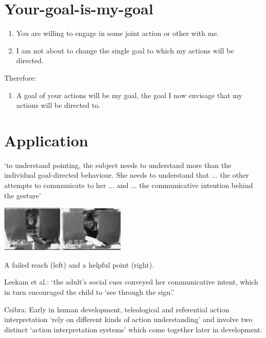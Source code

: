 \documentclass[11pt]{extarticle}
\begin{document}
\begin{multicols}{3}
\section{Your-goal-is-my-goal}
\begin{enumerate}
\item You are willing to engage in some joint action or other with me.

\item I am not about to change the single goal to which my actions will be directed.

\end{enumerate}
%
Therefore:
%
\begin{enumerate}[resume]
%
\item A goal of your actions will be my goal, the goal I now envisage that my actions will be directed to.
\end{enumerate}
%

\section{Application}

`to understand pointing, the subject needs to understand more than the individual goal-directed behaviour. She needs to understand that ... the other attempts to communicate to her ...  and ... the communicative intention behind the gesture'\citep{Moll:2007gu}


\begin{center}
\includegraphics[width=6cm]{figure_hare_toma_2004_e3.png}
\label{fig:reach_point}

A failed reach (left) and a helpful point (right).\citep%
	{hare_chimpanzees_2004}
\end{center}



Leekam et al.: `the adult’s social cues conveyed her communicative intent, which in turn encouraged the child to `see through the sign'.'
\citep%
{leekam_adults_2010}


Csibra: Early in human development,
teleological and referential action interpretation 
`rely on different kinds of action understanding' %
and
involve two distinct `action interpretation systems'   %
which come together later in development.\citep{Csibra:2003kp}



\footnotesize 


\end{multicols}
\end{document}
